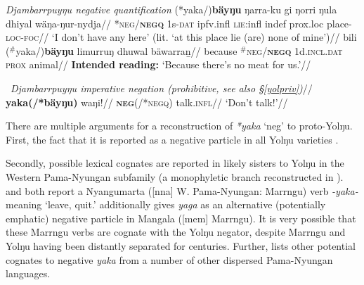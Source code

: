 {\pex{} \textit{Djambarrpuyŋu negative quantification}
\a\begingl
	\gla (*yaka/)\textbf{bäyŋu} ŋarra-ku gi ŋorri ŋula dhiyal wäŋa-ŋur-nydja//
	\glb \textsc{*neg/\textbf{negq}} 1\gls{s}\textsc{-dat} \gls{ipfv}.\gls{infl} \textsc{lie}:\gls{infl} \gls{indef} \gls{prox}.\gls{loc} place-\textsc{loc-foc}//
	\glft`I don't have any here' (lit. `at this place lie (are) none of mine')\hfill\citep[691]{Wilkinson1991}//
	\endgl
\a\begingl\gla bili ($^\#$yaka/)\textbf{bäyŋu} limurruŋ dhuwal bäwarraṉ//
\glb because \textsc{$^\#$neg/\textbf{negq}} 1\gls{d}.\textsc{incl.dat} \textsc{prox} animal//
\glft\textbf{Intended reading:} `Because there's no meat for us.'//\endgl{}
\xe

\pex~\begingl\glpreamble\textit{Djambarrpuyŋu imperative negation (prohibitive, see also §\ref{yolpriv})}//
\gla \textbf{yaka(/*bäyŋu)} waŋi!//
\glb \textsc{\textbf{neg}(/*negq)} talk.\textsc{infl}//
\glft`Don't talk!'//\endgl\xe


There are multiple arguments for a reconstruction of \textit{*yaka} `\gls{neg}' to proto-Yolŋu. First, the fact that it is reported as a negative particle in all Yolŋu varieties \citep[31]{Schebeck2001}.

 Secondly, possible lexical cognates are reported in likely sisters to Yolŋu in the Western Pama-Nyungan subfamily (a monophyletic branch reconstructed in \citealt[838]{Bowern2012}). \citet[226]{Sharp2004} and \citet[67]{Ogrady1963} both report a Nyangumarta ([\gls{nna}] W. Pama-Nyungan: Marrngu) verb \textit{-yaka-} meaning `leave, quit.' \citet[35]{Mckelson1974} additionally gives \textit{yaga} as an alternative (potentially emphatic) negative particle in Mangala ([\gls{mem}] Marrngu). It is very possible that these Marrngu verbs are cognate with the Yolŋu negator, despite Marrngu and Yolŋu having been distantly separated for centuries. Further, \citet[85]{Dixon2002a} lists other potential cognates to negative \textit{yaka} from a number of other dispersed Pama-Nyungan languages.
 
}
